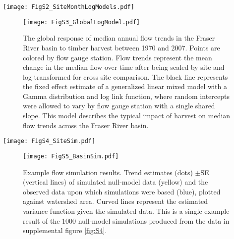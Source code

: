 \documentclass[grl]{agutexSI}
\begin{document}
\begin{sidewaysfigure}[h]
	\centering
	\noindent\texttt{[image: FigS2\_SiteMonthLogModels.pdf]}
	\caption{The response of monthly median flow trends (1970-2007) to logging in 55 sub-basins (colors) of the Fraser River watershed. Timber harvest is quantified as the percent of watershed area cut in the previous five years. Flow trends represent the mean change in median flow over time after being scaled by site and log transformed to facilitate cross site comparsion. Lines, estimated using a linear model, depict the change in flow trends with increasing timber harvest for each flow gauge station.}
	\label{fig:S2}
\end{sidewaysfigure}

\begin{figure}[h]
	\centering
	\noindent\texttt{[image: FigS3\_GlobalLogModel.pdf]}
	\caption{The global response of median annual flow trends in the Fraser River basin to timber harvest between 1970 and 2007. Points are colored by flow gauge station. Flow trends represent the mean change in the median flow over time after being scaled by site and log transformed for cross site comparison. The black line represents the fixed effect estimate of a generalized linear mixed model with a Gamma distribution and log link function, where random intercepts were allowed to vary by flow gauge station with a single shared slope. This model describes the typical impact of harvest on median flow trends across the Fraser River basin.}
	\label{fig:S3}
\end{figure}

\begin{sidewaysfigure}[h]
	\centering
	\noindent\texttt{[image: FigS4\_SiteSim.pdf]}
	\caption{Example site specific flow simulations. Annual median-flow simulations (yellow) and observations (blue) for all 55 sites considered in this study found within the Fraser River basin. Simulations at each site were parameterized using the observed data but no trend was imposed. Fifty-five site simulations equate to one basin-wide simulation. Each flow metric was simulated 1000 times basin-wide per response variable. See supplemental figure \ref{fig:S5} for resultant basin-wide simulation.}
	\label{fig:S4}
\end{sidewaysfigure}

\begin{figure}[h]
	\centering
	\noindent\texttt{[image: FigS5\_BasinSim.pdf]}
	\caption{Example flow simulation results. Trend estimates (dots) $\pm$SE (vertical lines) of simulated null-model data (yellow) and the observed data upon which simulations were based (blue), plotted against watershed area. Curved lines represent the estimated variance function given the simulated data. This is a single example result of the 1000 null-model simulations produced from the data in supplemental figure \ref{fig:S4}.}
	\label{fig:S5}
\end{figure}
\end{document}
